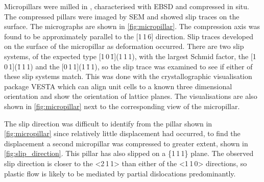 Micropillars were milled in , characterised with EBSD and compressed in situ. The compressed pillars were imaged by SEM and showed slip traces on the surface. The micrographs are shown in \autoref{fig:micropillar}. The compression axis was found to be approximately parallel to the [1\,1\,6] direction. Slip traces developed on the surface of the micropillar as deformation occurred. There are two slip systems, of the expected type [1\,0\,\={1}](1\,1\,1), with the largest Schmid factor, the [1\,0\,1](\={1}\,1\,1) and the [0\,1\,1](1\,\={1}\,1), so the slip trace was examined to see if either of these slip systems match. This was done with the crystallographic visualisation package VESTA \cite{Momma2011,Momma2014} which can align unit cells to a known three dimensional orientation and show the orientation of lattice planes. The visualisations are also shown in \autoref{fig:micropillar} next to the corresponding view of the micropillar.



The slip direction was difficult to identify from the pillar shown in \autoref{fig:micropillar} since relatively little displacement had occurred, to find the displacement a second micropillar was compressed to greater extent, shown in \autoref{fig:slip_direction}. This pillar has also slipped on a \{1\,1\,1\} plane. The observed slip direction is closer to the <2\,1\,1> than either of the <1\,1\,0> directions, so plastic flow is likely to be mediated by partial dislocations predominantly.

